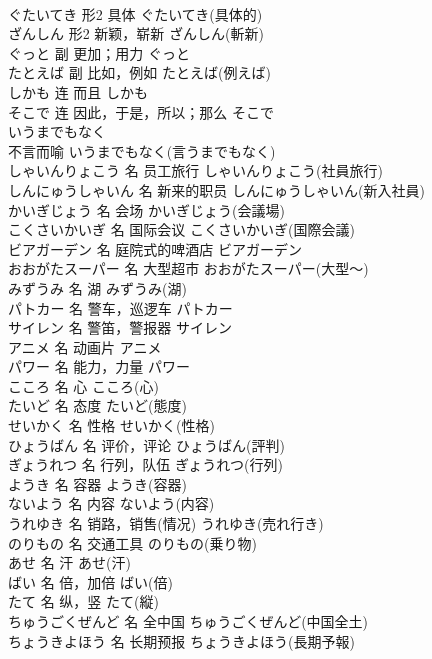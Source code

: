 \documentclass[8pt]{extreport}
\begin{document}
\begin{CJK}{UTF8}{min}
\\	ぐたいてき	形2	具体	ぐたいてき(具体的)	
\\	ざんしん	形2	新颖，崭新	ざんしん(斬新)	
\\	ぐっと	副	更加；用力	ぐっと	
\\	たとえば	副	比如，例如	たとえば(例えば)	
\\	しかも	连	而且	しかも	
\\	そこで	连	因此，于是，所以；那么	そこで	
\\	いうまでもなく	
\\	不言而喻	いうまでもなく(言うまでもなく)	
\\	しゃいんりょこう	名	员工旅行	しゃいんりょこう(社員旅行)	
\\	しんにゅうしゃいん	名	新来的职员	しんにゅうしゃいん(新入社員)	
\\	かいぎじょう	名	会场	かいぎじょう(会議場)	
\\	こくさいかいぎ	名	国际会议	こくさいかいぎ(国際会議)	
\\	ビアガーデン	名	庭院式的啤酒店	ビアガーデン	
\\	おおがたスーパー	名	大型超市	おおがたスーパー(大型～)	
\\	みずうみ	名	湖	みずうみ(湖)	
\\	パトカー	名	警车，巡逻车	パトカー	
\\	サイレン	名	警笛，警报器	サイレン	
\\	アニメ	名	动画片	アニメ	
\\	パワー	名	能力，力量	パワー	
\\	こころ	名	心	こころ(心)	
\\	たいど	名	态度	たいど(態度)	
\\	せいかく	名	性格	せいかく(性格)	
\\	ひょうばん	名	评价，评论	ひょうばん(評判)	
\\	ぎょうれつ	名	行列，队伍	ぎょうれつ(行列)	
\\	ようき	名	容器	ようき(容器)	
\\	ないよう	名	内容	ないよう(内容)	
\\	うれゆき	名	销路，销售(情况)	うれゆき(売れ行き)	
\\	のりもの	名	交通工具	のりもの(乗り物)	
\\	あせ	名	汗	あせ(汗)	
\\	ばい	名	倍，加倍	ばい(倍)	
\\	たて	名	纵，竖	たて(縦)	
\\	ちゅうごくぜんど	名	全中国	ちゅうごくぜんど(中国全土)	
\\	ちょうきよほう	名	长期预报	ちょうきよほう(長期予報)	

\end{CJK}
\end{document}
